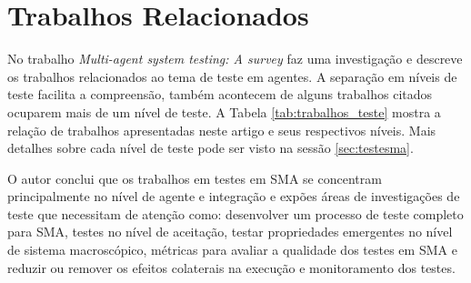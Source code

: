 \chapter{Trabalhos Relacionados}

No trabalho \textit{Multi-agent system testing: A survey} \citet{houhamdi2011multi} faz uma investigação e descreve os trabalhos relacionados ao tema de teste em agentes. A separação em níveis de teste facilita a compreensão, também acontecem de alguns trabalhos citados ocuparem mais de um nível de teste. A Tabela \ref{tab:trabalhos_teste} mostra a relação de trabalhos apresentadas neste artigo e seus respectivos níveis. Mais detalhes sobre cada nível de teste pode ser visto na sessão \ref{sec:testesma}.

O autor conclui que os trabalhos em testes em SMA se concentram principalmente no nível de agente e integração e expões áreas de investigações de teste que necessitam de atenção como: desenvolver um processo de teste completo para SMA, testes no nível de aceitação, testar propriedades emergentes no nível de sistema macroscópico, métricas para avaliar a qualidade dos testes em SMA e reduzir ou remover os efeitos colaterais na execução e monitoramento dos testes.


